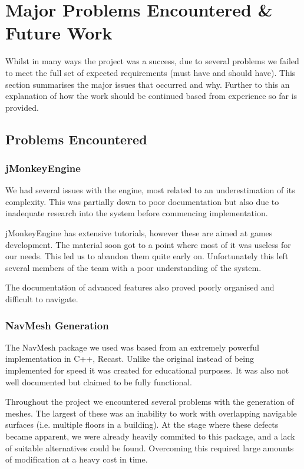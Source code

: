 

\section{Major Problems Encountered \& Future Work}

Whilst in many ways the project was a success, due to several problems
we failed to meet the full set of expected requirements (must have
and should have). This section summarises the major issues that occurred
and why. Further to this an explanation of how the work should be
continued based from experience so far is provided.


\subsection{Problems Encountered}
\label{Problems:subsec:problemsecountered}

\subsubsection{jMonkeyEngine}

We had several issues with the engine, most related to an underestimation
of its complexity. This was partially down to poor documentation but
also due to inadequate research into the system before commencing
implementation.

jMonkeyEngine has extensive tutorials, however these are aimed at games
development. The material soon got to a point where most of it was
useless for our needs. This led us to abandon them quite early on.
Unfortunately this left several members of the team with a poor understanding
of the system.

The documentation of advanced features also proved poorly organised and difficult to navigate.

\subsubsection{NavMesh Generation}
\label{Problems:subsubsec:navmesh}
The NavMesh package we used was based from an extremely powerful implementation
in C++, Recast. Unlike the original instead of being implemented for
speed it was created for educational purposes. It was also not well
documented but claimed to be fully functional.

Throughout the project we encountered several problems with the generation
of meshes. The largest of these was an inability to work with overlapping
navigable surfaces (i.e. multiple floors in a building). At the stage where these defects became apparent, we were already
heavily commited to this package, and a lack of suitable alternatives could be found. Overcoming
this required large amounts of modification at a heavy cost in time.


